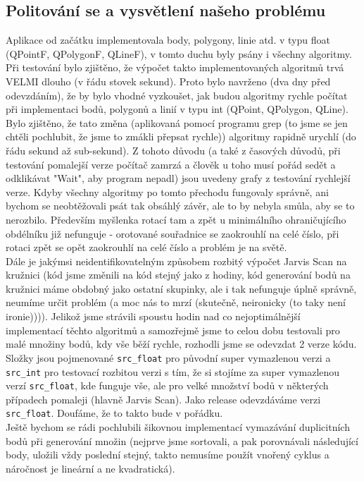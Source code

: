 \documentclass[a4paper, 12pt]{article}
\begin{document}
\subsection{Politování se a vysvětlení našeho problému}
Aplikace od začátku implementovala body, polygony, linie atd. v typu float (QPointF, QPolygonF, QLineF), v tomto duchu byly psány i všechny algoritmy. Při testování bylo zjištěno, že výpočet takto implementovaných algoritmů trvá VELMI dlouho (v řádu stovek sekund). Proto bylo navrženo (dva dny před odevzdáním), že by bylo vhodné vyzkoušet, jak budou algoritmy rychle počítat při implementaci bodů, polygonů a linií v typu int (QPoint, QPolygon, QLine). Bylo zjištěno, že tato změna (aplikovaná pomocí programu grep (to jsme se jen chtěli pochlubit, že jsme to zmákli přepsat rychle)) algoritmy rapidně urychlí (do řádu sekund až sub-sekund). Z tohoto důvodu (a také z časových důvodů, při testování pomalejší verze počítač zamrzá a člověk u toho musí pořád sedět a odklikávat "Wait", aby program nepadl) jsou uvedeny grafy z testování rychlejší verze. Kdyby všechny algoritmy po tomto přechodu fungovaly správně, ani bychom se neobtěžovali psát tak obsáhlý závěr, ale to by nebyla smůla, aby se to nerozbilo. Především myšlenka rotací tam a zpět u minimálního ohraničujícího obdélníku již nefunguje - orotované souřadnice se zaokrouhlí na celé číslo, při rotaci zpět se opět zaokrouhlí na celé číslo a problém je na světě. \\
Dále je jakýmsi neidentifikovatelným způsobem rozbitý výpočet Jarvis Scan na kružnici (kód jsme změnili na kód stejný jako z hodiny, kód generování bodů na kružnici máme obdobný jako ostatní skupinky, ale i tak nefunguje úplně správně, neumíme určit problém (a moc nás to mrzí (skutečně, neironicky (to taky není ironie)))). Jelikož jsme strávili spoustu hodin nad co nejoptimálnější implementací těchto algoritmů a samozřejmě jsme to celou dobu testovali pro malé množiny bodů, kdy vše běží rychle, rozhodli jsme se odevzdat 2 verze kódu. Složky jsou pojmenované \texttt{src\_float} pro původní super vymazlenou verzi a \texttt{src\_int} pro testovací rozbitou verzi s tím, že si stojíme za super vymazlenou verzí \texttt{src\_float}, kde funguje vše, ale pro velké množství bodů v některých případech pomaleji (hlavně Jarvis Scan). Jako release odevzdáváme verzi \texttt{src\_float}. Doufáme, že to takto bude v pořádku.\\
 Ještě bychom se rádi pochlubili šikovnou implementací vymazávání duplicitních bodů při generování množin (nejprve jsme sortovali, a pak porovnávali následující body, uložili vždy poslední stejný, takto nemusíme použít vnořený cyklus a náročnost je lineární a ne kvadratická).
\end{document}
